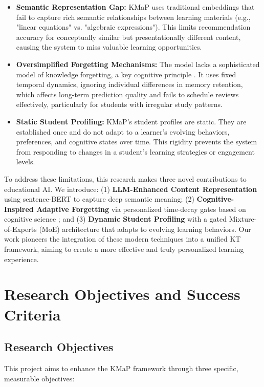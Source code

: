 \documentclass[project-plan]{report-template}
\begin{document}
\begin{itemize}
    \item \textbf{Semantic Representation Gap:} KMaP uses traditional embeddings that fail to capture rich semantic relationships between learning materials (e.g., "linear equations" vs. "algebraic expressions"). This limits recommendation accuracy for conceptually similar but presentationally different content, causing the system to miss valuable learning opportunities.
    \item \textbf{Oversimplified Forgetting Mechanisms:} The model lacks a sophisticated model of knowledge forgetting, a key cognitive principle \cite{ebbinghaus1885memory}. It uses fixed temporal dynamics, ignoring individual differences in memory retention, which affects long-term prediction quality and fails to schedule reviews effectively, particularly for students with irregular study patterns.
    \item \textbf{Static Student Profiling:} KMaP's student profiles are static. They are established once and do not adapt to a learner's evolving behaviors, preferences, and cognitive states over time. This rigidity prevents the system from responding to changes in a student's learning strategies or engagement levels.
\end{itemize}

To address these limitations, this research makes three novel contributions to educational AI. We introduce: (1) \textbf{LLM-Enhanced Content Representation} using sentence-BERT \cite{reimers2019sentence} to capture deep semantic meaning; (2) \textbf{Cognitive-Inspired Adaptive Forgetting} via personalized time-decay gates based on cognitive science \cite{wixted2004psychology,sha2024forgetting}; and (3) \textbf{Dynamic Student Profiling} with a gated Mixture-of-Experts (MoE) architecture \cite{fedus2022switch,shelhamer2022mixture} that adapts to evolving learning behaviors. Our work pioneers the integration of these modern techniques into a unified KT framework, aiming to create a more effective and truly personalized learning experience.

\section{Research Objectives and Success Criteria}

\subsection{Research Objectives}
This project aims to enhance the KMaP framework through three specific, measurable objectives:
\end{document}
